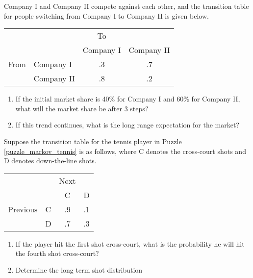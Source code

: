 \begin{puzzle}
    Company I and Company II compete against each other, and the transition table for people switching from Company I to Company II is given below.

    \begin{center}
        \begin{tabular}{ll|cc}
                 &            & To        &            \\
                 &            & Company I & Company II \\
            \hline
            From & Company I  & .3        & .7         \\
                 & Company II & .8        & .2         \\
        \end{tabular}
    \end{center}

    \begin{enumerate}
        \item If the initial market share is 40\% for Company I and 60\% for Company II, what will the market share be after 3 steps?
        \item If this trend continues, what is the long range expectation for the market?
    \end{enumerate}
\end{puzzle}

\begin{puzzle}
    Suppose the transition table for the tennis player in Puzzle \ref{puzzle_markov_tennis} is as follows, where C denotes the cross-court shots and D denotes down-the-line shots.

    \begin{center}
        \begin{tabular}{ll|cc}
                     &   & Next &    \\
                     &   & C    & D  \\
            \hline
            Previous & C & .9   & .1 \\
                     & D & .7   & .3 \\
        \end{tabular}
    \end{center}

    \begin{enumerate}
        \item If the player hit the first shot cross-court, what is the probability he will hit the fourth shot
              cross-court?
        \item Determine the long term shot distribution
    \end{enumerate}
\end{puzzle}

